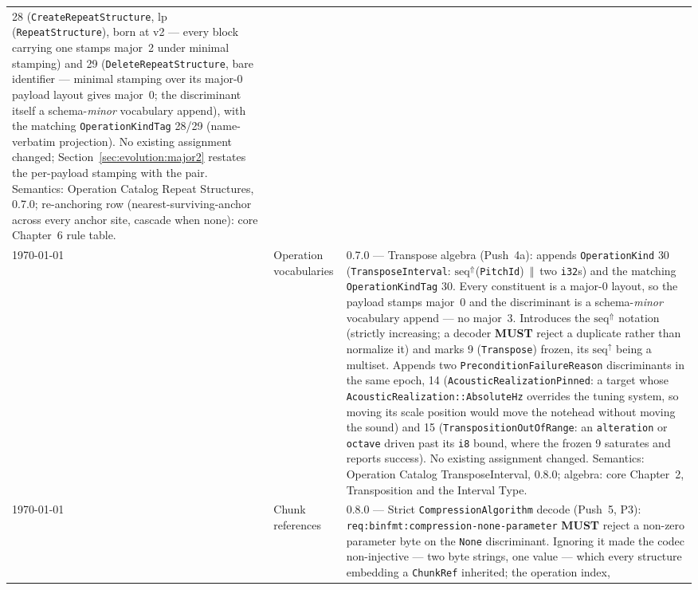 \documentclass[11pt,letterpaper]{report}
\newcommand{\tablenums}[1]{{\addfontfeatures{Numbers={Lining,Tabular}}#1}}
\newcommand{\sectionsc}[1]{{\addfontfeatures{Letters=SmallCaps}#1}}
\newcommand{\MUST}{\textbf{MUST}}
\newcommand{\cat}{\ensuremath{\,\Vert\,}}
\begin{document}
\begin{longtable}{p{2cm} p{2.5cm} p{9cm}}
  \tablenums{28} (\texttt{CreateRepeatStructure},
  $\mathrm{lp}$(\texttt{RepeatStructure}), born at v2 --- every block
  carrying one stamps major~2 under minimal stamping) and \tablenums{29}
  (\texttt{DeleteRepeatStructure}, bare identifier --- minimal stamping
  over its major-0 payload layout gives major~0; the discriminant itself
  a schema-\emph{minor} vocabulary append), with the
  matching \texttt{OperationKindTag} \tablenums{28}/\tablenums{29}
  (name-verbatim projection). No existing assignment changed;
  Section~\ref{sec:evolution:major2} restates the per-payload stamping
  with the pair. Semantics: Operation Catalog \sectionsc{Repeat
  Structures}, 0.7.0; re-anchoring row (nearest-surviving-anchor across
  every anchor site, cascade when none): core Chapter~6 rule table. \\
    \today & Operation vocabularies & 0.7.0 --- Transpose algebra (Push~4a):
  appends \texttt{OperationKind} \tablenums{30}
  (\texttt{TransposeInterval}: $\mathrm{seq}^{\Uparrow}$(\texttt{PitchId})
  \cat{} two \texttt{i32}s) and the matching \texttt{OperationKindTag}
  \tablenums{30}. Every constituent is a major-0 layout, so the payload
  stamps major~\tablenums{0} and the discriminant is a schema-\emph{minor}
  vocabulary append --- no major~3. Introduces the
  $\mathrm{seq}^{\Uparrow}$ notation (strictly increasing; a decoder
  \MUST{} reject a duplicate rather than normalize it) and marks
  \tablenums{9} (\texttt{Transpose}) frozen, its
  $\mathrm{seq}^{\uparrow}$ being a multiset. Appends two
  \texttt{PreconditionFailureReason} discriminants in the same epoch,
  \tablenums{14} (\texttt{AcousticRealizationPinned}: a target whose
  \texttt{AcousticRealization::AbsoluteHz} overrides the tuning system, so
  moving its scale position would move the notehead without moving the
  sound) and \tablenums{15} (\texttt{TranspositionOutOfRange}: an
  \texttt{alteration} or \texttt{octave} driven past its \texttt{i8}
  bound, where the frozen \tablenums{9} saturates and reports success).
  No existing assignment changed. Semantics: Operation Catalog
  \sectionsc{TransposeInterval}, 0.8.0; algebra: core Chapter~2,
  \sectionsc{Transposition and the Interval Type}. \\
    \today & Chunk references & 0.8.0 --- Strict \texttt{CompressionAlgorithm}
  decode (Push~5, P3): \texttt{req:binfmt:compression-none-parameter} \MUST{}
  reject a non-zero parameter byte on the \texttt{None} discriminant. Ignoring
  it made the codec non-injective --- two byte strings, one value --- which
  every structure embedding a \texttt{ChunkRef} inherited; the operation index,

\end{longtable}
\end{document}
